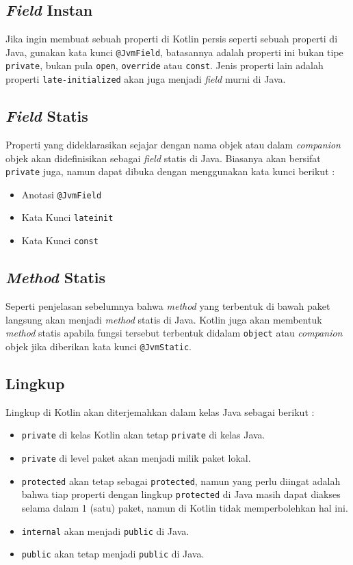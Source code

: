 \subsection{\textit{Field} Instan}

Jika ingin membuat sebuah properti di Kotlin persis seperti sebuah properti di Java, gunakan kata kunci \texttt{@JvmField}, batasannya adalah properti ini bukan tipe \texttt{private}, bukan pula \texttt{open}, \texttt{override} atau \texttt{const}. Jenis properti lain adalah properti \texttt{late-initialized} akan juga menjadi \textit{field} murni di Java.

\subsection{\textit{Field} Statis}

Properti yang dideklarasikan sejajar dengan nama objek atau dalam \textit{companion} objek akan didefinisikan sebagai \textit{field} statis di Java. Biasanya akan bersifat \texttt{private} juga, namun dapat dibuka dengan menggunakan kata kunci berikut :

\begin{itemize}
	\item Anotasi \texttt{@JvmField}
	\item Kata Kunci \texttt{lateinit}
	\item Kata Kunci \texttt{const}
\end{itemize}

\subsection{\textit{Method} Statis}

Seperti penjelasan sebelumnya bahwa \textit{method} yang terbentuk di bawah paket langsung akan menjadi \textit{method} statis di Java. Kotlin juga akan membentuk \textit{method} statis apabila fungsi tersebut terbentuk didalam \texttt{object} atau \textit{companion} objek jika diberikan kata kunci \texttt{@JvmStatic}.

\subsection{Lingkup}

Lingkup di Kotlin akan diterjemahkan dalam kelas Java sebagai berikut :

\begin{itemize}
	\item \texttt{private} di kelas Kotlin akan tetap \texttt{private} di kelas Java.
	\item \texttt{private} di level paket akan menjadi milik paket lokal.
	\item \texttt{protected} akan tetap sebagai \texttt{protected}, namun yang perlu diingat adalah bahwa tiap properti dengan lingkup \texttt{protected} di Java masih dapat diakses selama dalam 1 (satu) paket, namun di Kotlin tidak memperbolehkan hal ini.
	\item \texttt{internal} akan menjadi \texttt{public} di Java.
	\item \texttt{public} akan tetap menjadi \texttt{public} di Java.
\end{itemize}

